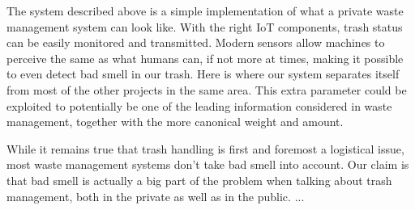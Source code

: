 The system described above is a simple implementation of what a private waste management system can look like. 
With the right IoT components, trash status can be easily monitored and transmitted.
Modern sensors allow machines to perceive the same as what humans can, if not more at times, making it possible to even detect bad smell in our trash.
Here is where our system separates itself from most of the other projects in the same area.
This extra parameter could be exploited to potentially be one of the leading information considered in waste management, together with the more canonical weight and amount. 

While it remains true that trash handling is first and foremost a logistical issue, most waste management systems don't take bad smell into account.
Our claim is that bad smell is actually a big part of the problem when talking about trash management,  both in the private as well as in the public.
...
